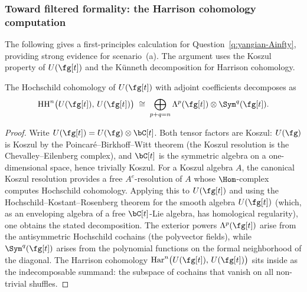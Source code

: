 
\subsubsection*{Toward filtered formality: the Harrison cohomology computation}

The following gives a first-principles calculation for
Question~\ref{q:yangian-Ainfty}, providing strong evidence for
scenario~(a). The argument uses the Koszul property of
$U(\fg[t])$ and the K\"unneth decomposition for Harrison
cohomology.

\begin{proposition}
\label{prop:HH-Ugt-decomposition}
The Hochschild cohomology of $U(\fg[t])$ with adjoint
coefficients decomposes as
\[
 \HH^n\bigl(U(\fg[t]),\, U(\fg[t])\bigr)
 \;\cong\;
 \bigoplus_{p+q=n}
 \Lambda^p(\fg[t]) \otimes \Sym^q(\fg[t]).
\]
\end{proposition}

\begin{proof}
Write $U(\fg[t]) = U(\fg) \otimes \bC[t]$. Both tensor
factors are Koszul: $U(\fg)$ is Koszul by the
Poincar\'e--Birkhoff--Witt theorem (the Koszul resolution is
the Chevalley--Eilenberg complex), and $\bC[t]$ is the
symmetric algebra on a one-dimensional space, hence trivially
Koszul. For a Koszul algebra $A$, the canonical Koszul
resolution provides a free $A^e$-resolution of $A$ whose
$\Hom$-complex computes Hochschild cohomology. Applying this
to $U(\fg[t])$ and using the Hochschild--Kostant--Rosenberg
theorem for the smooth algebra $U(\fg[t])$ (which, as an
enveloping algebra of a free $\bC[t]$-Lie algebra, has
homological regularity), one obtains the stated
decomposition. The exterior powers $\Lambda^p(\fg[t])$
arise from the antisymmetric Hochschild cochains (the
polyvector fields), while $\Sym^q(\fg[t])$ arises from the
polynomial functions on the formal neighborhood of the
diagonal. The Harrison cohomology
$\Har^n\bigl(U(\fg[t]),\, U(\fg[t])\bigr)$ sits inside as
the indecomposable summand: the subspace of cochains that
vanish on all non-trivial shuffles.
\end{proof}


